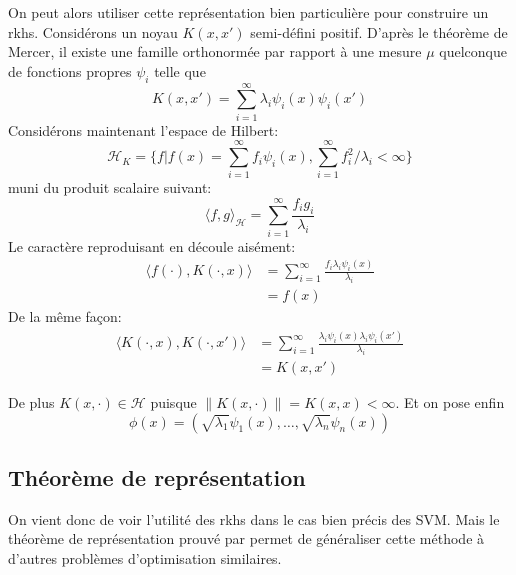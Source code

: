 On peut alors utiliser cette représentation bien particulière pour construire un \ac{rkhs}. Considérons un noyau $K(x,x')$ semi-défini positif. D'après le théorème de Mercer, il existe une famille orthonormée par rapport à une mesure $\mu$ quelconque de fonctions propres $\psi_i$ telle que
\begin{equation*}
    K(x,x') = \sum_{i=1}^\infty \lambda_i \psi_i (x) \psi_i (x')
\end{equation*}
Considérons maintenant l'espace de Hilbert: 
\begin{equation*}
    \mathcal{H}_K = \{f | f(x) = \sum_{i=1}^\infty f_i \psi_i (x) , \sum_{i=1}^\infty f_i^2 / \lambda_i < \infty \}
\end{equation*}
muni du produit scalaire suivant:
\begin{equation*}
    \langle f,g \rangle_{\mathcal{H}} = \sum_{i=1}^\infty \frac{f_i g_i}{\lambda_i}
\end{equation*}
Le caractère reproduisant en découle aisément:
\begin{align*}
    \langle f(\cdot) , K(\cdot,x) \rangle &= \sum_{i=1}^\infty \frac{f_i \lambda_i \psi_i (x)}{\lambda_i} \\
    &= f(x)
\end{align*}
De la même façon:
\begin{align*}
    \langle K(\cdot,x) , K(\cdot,x') \rangle &= \sum_{i=1}^\infty \frac{\lambda_i \psi_i (x) \lambda_i \psi_i (x')}{\lambda_i} \\
    &= K(x,x')
\end{align*}

De plus $K(x,\cdot) \in \mathcal{H}$ puisque $ \| K(x,\cdot) \| = K(x,x) < \infty $. Et on pose enfin
\begin{equation*}
    \phi(x) = \left( \sqrt{\lambda_1} \psi_1 (x) , \dots , \sqrt{\lambda_n} \psi_n (x) \right)
\end{equation*}

\subsection{Théorème de représentation}

On vient donc de voir l'utilité des \ac{rkhs} dans le cas bien précis des SVM. Mais le théorème de représentation prouvé par \citet{Scholkopf2001} permet de généraliser cette méthode à d'autres problèmes d'optimisation similaires.

